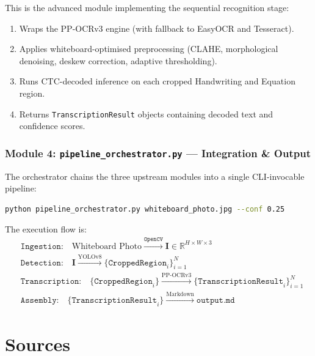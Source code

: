 \documentclass[11pt, a4paper]{article}
\newcommand{\Reals}{\mathbb{R}}
\begin{document}
This is the advanced module implementing the sequential recognition stage:
\begin{enumerate}
  \item Wraps the PP-OCRv3 engine (with fallback to EasyOCR and Tesseract).
  \item Applies whiteboard-optimised preprocessing (CLAHE, morphological denoising, deskew correction, adaptive thresholding).
  \item Runs CTC-decoded inference on each cropped Handwriting and Equation region.
  \item Returns \texttt{TranscriptionResult} objects containing decoded text and confidence scores.
\end{enumerate}

\subsubsection{Module 4: \texttt{pipeline\_orchestrator.py} — Integration \& Output}

The orchestrator chains the three upstream modules into a single CLI-invocable pipeline:
\begin{lstlisting}[language=bash, caption={Pipeline invocation}]
python pipeline_orchestrator.py whiteboard_photo.jpg --conf 0.25
\end{lstlisting}

The execution flow is:
\begin{align*}
  &\texttt{Ingestion:} \quad \text{Whiteboard Photo} \xrightarrow{\texttt{OpenCV}} \mathbf{I} \in \Reals^{H \times W \times 3} \\
  &\texttt{Detection:} \quad \mathbf{I} \xrightarrow{\text{YOLOv8}} \bigl\{\texttt{CroppedRegion}_i\bigr\}_{i=1}^{N} \\
  &\texttt{Transcription:} \quad \bigl\{\texttt{CroppedRegion}_i\bigr\} \xrightarrow{\text{PP-OCRv3}} \bigl\{\texttt{TranscriptionResult}_i\bigr\}_{i=1}^{N} \\
  &\texttt{Assembly:} \quad \bigl\{\texttt{TranscriptionResult}_i\bigr\} \xrightarrow{\text{Markdown}} \texttt{output.md}
\end{align*}


\section{Sources}\label{sec:sources}

\printbibliography[heading=none]
\end{document}
